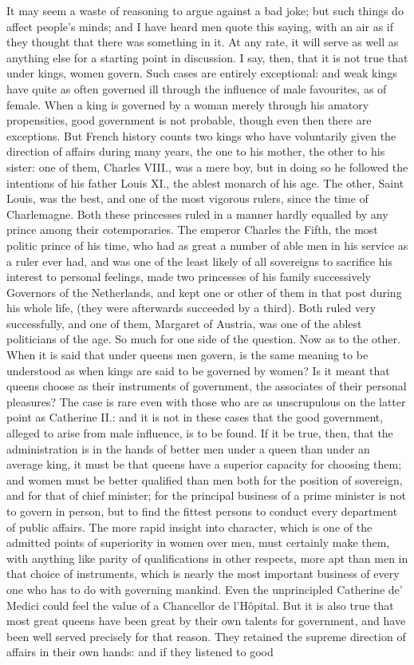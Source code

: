 \documentclass[12pt]{report}
\begin{document}
It may seem a waste of reasoning to argue against a bad joke; but such things do affect people's minds; and I have heard men quote this saying, with an air as if they thought that there was something in it. At any rate, it will serve as well as anything else for a starting point in discussion. I say, then, that it is not true that under kings, women govern. Such cases are entirely exceptional: and weak kings have quite as often governed ill through the influence of male favourites, as of female. When a king is governed by a woman merely through his amatory propensities, good government is not probable, though even then there are exceptions. But French history counts two kings who have voluntarily given the direction of affairs during many years, the one to his mother, the other to his sister: one of them, Charles VIII., was a mere boy, but in doing so he followed the intentions of his father Louis XI., the ablest monarch of his age. The other, Saint Louis, was the best, and one of the most vigorous rulers, since the time of Charlemagne. Both these princesses ruled in a manner hardly equalled by any prince among their cotemporaries. The emperor Charles the Fifth, the most politic prince of his time, who had as great a number of able men in his service as a ruler ever had, and was one of the least likely of all sovereigns to sacrifice his interest to personal feelings, made two princesses of his family successively Governors of the Netherlands, and kept one or other of them in that post during his whole life, (they were afterwards succeeded by a third). Both ruled very successfully, and one of them, Margaret of Austria, was one of the ablest politicians of the age. So much for one side of the question. Now as to the other. When it is said that under queens men govern, is the same meaning to be understood as when kings are said to be governed by women? Is it meant that queens choose as their instruments of government, the associates of their personal pleasures? The case is rare even with those who are as unscrupulous on the latter point as Catherine II.: and it is not in these cases that the good government, alleged to arise from male influence, is to be found. If it be true, then, that the administration is in the hands of better men under a queen than under an average king, it must be that queens have a superior capacity for choosing them; and women must be better qualified than men both for the position of sovereign, and for that of chief minister; for the principal business of a prime minister is not to govern in person, but to find the fittest persons to conduct every department of public affairs. The more rapid insight into character, which is one of the admitted points of superiority in women over men, must certainly make them, with anything like parity of qualifications in other respects, more apt than men in that choice of instruments, which is nearly the most important business of every one who has to do with governing mankind. Even the unprincipled Catherine de' Medici could feel the value of a Chancellor de l'Hôpital. But it is also true that most great queens have been great by their own talents for government, and have been well served precisely for that reason. They retained the supreme direction of affairs in their own hands: and if they listened to good 
\end{document}
